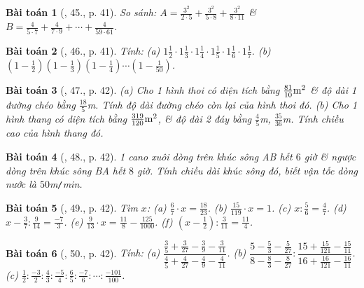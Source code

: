 \documentclass{article}
\newtheorem{baitoan}{Bài toán}
\begin{document}
\begin{baitoan}[\cite{SBT_Toan_6_Canh_Dieu_tap_2}, 45., p. 41]
	So sánh: $A = \frac{3^2}{2\cdot5} + \frac{3^2}{5\cdot8} + \frac{3^2}{8\cdot11}$ \& $B = \frac{4}{5\cdot7} + \frac{4}{7\cdot9} + \cdots + \frac{4}{59\cdot61}$.
\end{baitoan}

\begin{baitoan}[\cite{SBT_Toan_6_Canh_Dieu_tap_2}, 46., p. 41]
	Tính: (a) $1\frac{1}{2}\cdot1\frac{1}{3}\cdot1\frac{1}{4}\cdot1\frac{1}{5}\cdot1\frac{1}{6}\cdot1\frac{1}{7}$. (b) $\left(1 - \frac{1}{2}\right)\left(1 - \frac{1}{3}\right)\left(1 - \frac{1}{4}\right)\cdots\left(1 - \frac{1}{50}\right)$.
\end{baitoan}

\begin{baitoan}[\cite{SBT_Toan_6_Canh_Dieu_tap_2}, 47., p. 42]
	(a) Cho 1 hình thoi có diện tích bằng $\rm\frac{81}{10}m^2$ \& độ dài 1 đường chéo bằng $\frac{18}{5}$\emph{m}. Tính độ dài đường chéo còn lại của hình thoi đó. (b) Cho 1 hình thang có diện tích bằng $\rm\frac{319}{120}m^2$, \& độ dài 2 đáy bằng $\frac{4}{5}$\emph{m}, $\frac{35}{36}$\emph{m}. Tính chiều cao của hình thang đó.
\end{baitoan}

\begin{baitoan}[\cite{SBT_Toan_6_Canh_Dieu_tap_2}, 48., p. 42]
	1 cano xuôi dòng trên khúc sông AB hết $6$ giờ \& ngược dòng trên khúc sông BA hết $8$ giờ. Tính chiều dài khúc sông đó, biết vận tốc dòng nước là $50$\emph{m\texttt{/}min}.
\end{baitoan}

\begin{baitoan}[\cite{SBT_Toan_6_Canh_Dieu_tap_2}, 49., p. 42]
	Tìm $x$: (a) $\frac{6}{7}\cdot x = \frac{18}{23}$. (b) $\frac{15}{119}\cdot x = 1$. (c) $x:\frac{5}{6} = \frac{4}{7}$. (d) $x - \frac{3}{7}:\frac{9}{14} = \frac{-7}{3}$. (e) $\frac{9}{13}\cdot x = \frac{11}{8} - \frac{125}{1000}$. (f) $\left(x - \frac{1}{2}\right):\frac{3}{11} = \frac{11}{4}$.
\end{baitoan}

\begin{baitoan}[\cite{SBT_Toan_6_Canh_Dieu_tap_2}, 50., p. 42]
	Tính: (a) $\dfrac{\frac{3}{5} + \frac{3}{27} - \frac{3}{9} - \frac{3}{11}}{\frac{4}{5} + \frac{4}{27} - \frac{4}{9} - \frac{4}{11}}$. (b) $\dfrac{5 - \frac{5}{3} - \frac{5}{27}}{8 - \frac{8}{3} - \frac{8}{27}}:\dfrac{15 + \frac{15}{121} - \frac{15}{11}}{16 + \frac{16}{121} - \frac{16}{11}}$. (c) $\frac{1}{2}:\frac{-3}{2}:\frac{4}{3}:\frac{-5}{4}:\frac{6}{5}:\frac{-7}{6}:\cdots:\frac{-101}{100}$.
\end{baitoan}
\end{document}
